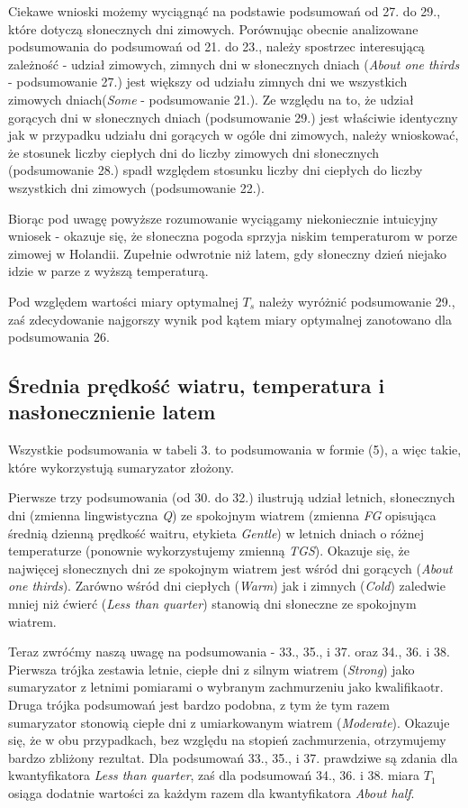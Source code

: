 \documentclass{classrep}
\begin{document}
Ciekawe wnioski możemy wyciągnąć na podstawie podsumowań od 27. do 29., które dotyczą słonecznych dni zimowych. Porównując obecnie analizowane podsumowania do podsumowań od 21. do 23., należy spostrzec interesującą zależność - udział zimowych, zimnych dni w słonecznych dniach (\textit{About one thirds} - podsumowanie 27.) jest większy od udziału zimnych dni we wszystkich zimowych dniach(\textit{Some} - podsumowanie 21.). Ze względu na to, że udział gorących dni w słonecznych dniach (podsumowanie 29.) jest właściwie identyczny jak w przypadku udziału dni gorących w ogóle dni zimowych, należy wnioskować, że stosunek liczby ciepłych dni do liczby zimowych dni słonecznych (podsumowanie 28.) spadł względem stosunku liczby dni ciepłych do liczby wszystkich dni zimowych (podsumowanie 22.).\newline

Biorąc pod uwagę powyższe rozumowanie wyciągamy niekoniecznie intuicyjny wniosek - okazuje się, że słoneczna pogoda sprzyja niskim temperaturom w porze zimowej w Holandii. Zupełnie odwrotnie niż latem, gdy słoneczny dzień niejako idzie w parze z wyższą temperaturą.\newline

Pod względem wartości miary optymalnej $T_s$ należy wyróżnić podsumowanie 29., zaś zdecydowanie najgorszy wynik pod kątem miary optymalnej zanotowano dla podsumowania 26.


\subsection{Średnia prędkość wiatru, temperatura i nasłonecznienie latem}
Wszystkie podsumowania w tabeli 3. to podsumowania w formie (5), a więc takie, które wykorzystują sumaryzator złożony.\newline

Pierwsze trzy podsumowania (od 30. do 32.) ilustrują udział letnich, słonecznych dni (zmienna lingwistyczna \textit{Q}) ze spokojnym wiatrem (zmienna \textit{FG} opisująca średnią dzienną prędkość waitru, etykieta \textit{Gentle}) w letnich dniach o różnej temperaturze (ponownie wykorzystujemy zmienną \textit{TGS}). Okazuje się, że najwięcej słonecznych dni ze spokojnym wiatrem jest wśród dni gorących (\textit{About one thirds}). Zarówno wśród dni ciepłych (\textit{Warm}) jak i zimnych (\textit{Cold}) zaledwie mniej niż ćwierć (\textit{Less than quarter}) stanowią dni słoneczne ze spokojnym wiatrem.\newline

Teraz zwróćmy naszą uwagę na podsumowania - 33., 35., i 37. oraz 34., 36. i 38. Pierwsza trójka zestawia letnie, ciepłe dni z silnym wiatrem (\textit{Strong}) jako sumaryzator z letnimi pomiarami o wybranym zachmurzeniu jako kwalifikaotr. Druga trójka podsumowań jest bardzo podobna, z tym że tym razem sumaryzator stonowią ciepłe dni z umiarkowanym wiatrem (\textit{Moderate}). Okazuje się, że w obu przypadkach, bez względu na stopień zachmurzenia, otrzymujemy bardzo zbliżony rezultat. Dla podsumowań 33., 35., i 37. prawdziwe są zdania dla kwantyfikatora \textit{Less than quarter}, zaś dla podsumowań 34., 36. i 38. miara $T_1$ osiąga dodatnie wartości za każdym razem dla kwantyfikatora \textit{About half}.\newline
\end{document}
